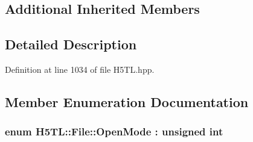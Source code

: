\subsection*{Additional Inherited Members}


\subsection{Detailed Description}


Definition at line 1034 of file H5\-T\-L.\-hpp.



\subsection{Member Enumeration Documentation}
\hypertarget{class_h5_t_l_1_1_file_a19ac74cd8f7db7d836092d9354b51208}{
\subsubsection[{Open\-Mode}]{\setlength{\rightskip}{0pt plus 5cm}enum {\bf H5\-T\-L\-::\-File\-::\-Open\-Mode} \-: unsigned int}}\label{class_h5_t_l_1_1_file_a19ac74cd8f7db7d836092d9354b51208}
